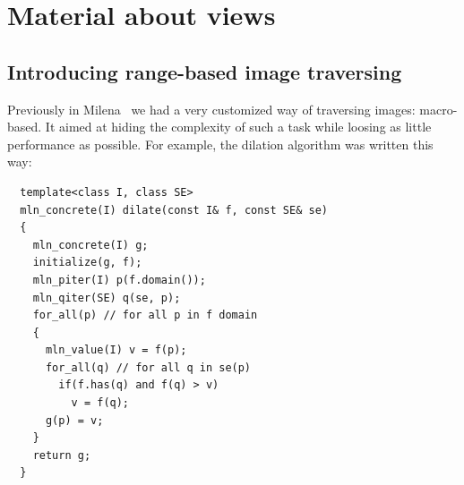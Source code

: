 % 
% 
% 
% 
% 




\cleardoublepage

\chapter*{Material about views}


\section*{Introducing range-based image traversing}
\label{sec.range.traversing}

Previously in Milena~\cite{levillain.2009.ismm} we had a very customized way of traversing images: macro-based. It aimed
at hiding the complexity of such a task while loosing as little performance as possible. For example, the dilation
algorithm was written this way:

\begin{verbatim}
  template<class I, class SE>
  mln_concrete(I) dilate(const I& f, const SE& se)
  {
    mln_concrete(I) g;
    initialize(g, f);
    mln_piter(I) p(f.domain());
    mln_qiter(SE) q(se, p);
    for_all(p) // for all p in f domain
    {
      mln_value(I) v = f(p);
      for_all(q) // for all q in se(p)
        if(f.has(q) and f(q) > v)
          v = f(q);
      g(p) = v;
    }
    return g;
  }
\end{verbatim}

